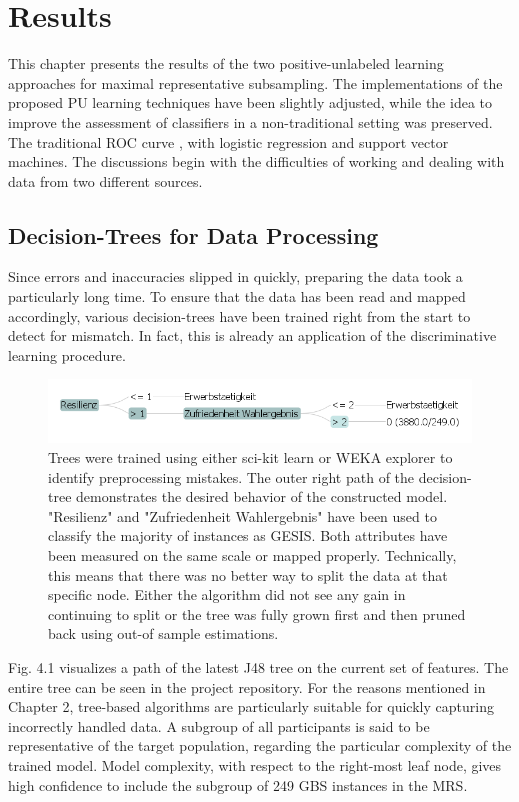 \chapter{Results}\label{Sec:Results}

This chapter presents the results of the two positive-unlabeled learning approaches for maximal representative subsampling. The implementations of the proposed PU learning techniques have been slightly adjusted, while the idea to improve the assessment of classifiers in a non-traditional setting was preserved. The traditional ROC curve , with logistic regression and support vector machines. The discussions begin with the difficulties of working and dealing with data from two different sources.

\section{Decision-Trees for Data Processing}

Since errors and inaccuracies slipped in quickly, preparing the data took a particularly long time. To ensure that the data has been read and mapped accordingly, various decision-trees have been trained right from the start to detect for mismatch. In fact, this is already an application of the discriminative learning procedure.

\begin{figure}[ht]
\centering
\vspace{0.25cm}
   \includegraphics[scale=0.65,angle=0]{fig/treepath}
\captionsetup{width= 380pt}
\caption{Trees were trained using either sci-kit learn or WEKA explorer to identify preprocessing mistakes. The outer right path of the decision-tree demonstrates the desired behavior of the constructed model. "Resilienz"  and "Zufriedenheit Wahlergebnis" have been used to classify the majority of instances as GESIS. Both attributes have been measured on the same scale or mapped properly. Technically, this means that there was no better way to split the data at that specific node. Either the algorithm did not see any gain in continuing to split or the tree was fully grown first and then pruned back using out-of sample estimations.}
\end{figure}

Fig. 4.1 visualizes a path of the latest J48 tree on the current set of features. The entire tree can be seen in the project repository. For the reasons mentioned in Chapter 2, tree-based algorithms are particularly suitable for quickly capturing incorrectly handled data. A subgroup of all participants is said to be representative of the target population, regarding the particular complexity of the trained model. Model complexity, with respect to the right-most leaf node, gives high confidence to include the subgroup of 249 GBS instances in the MRS. 

